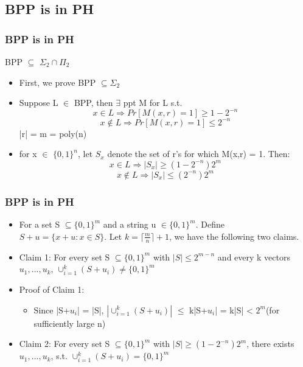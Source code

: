 \documentclass{beamer}
\begin{document}
\subsection{BPP is in PH}
\begin{frame}
\frametitle{BPP is in PH}
\begin{theorem}
BPP $\subseteq$ $\Sigma_{2} \cap \Pi_{2}$
\end{theorem}
\begin{itemize}
	\item First, we prove BPP $\subseteq \Sigma_{2}$ 
	\item Suppose L $\in$ BPP, then $\exists$ ppt M for L s.t.
	$$
	x \in L \Rightarrow Pr[M(x, r) = 1] \geq 1-2^{-n}
	$$
	$$
	x \notin L \Rightarrow Pr[M(x, r) = 1] \leq 2^{-n}
	$$
	|r| = m = poly(n)
	\item for x $\in$ $\{0,1\}^{n}$, let $S_{x}$ denote the set of r's for which M(x,r) = 1. Then:
	$$
	x \in L \Rightarrow |S_{x}| \geq (1-2^{-n})2^{m}
	$$
	$$
	x \notin L \Rightarrow |S_{x}| \leq (2^{-n})2^{m}
	$$
\end{itemize}
\end{frame}
\begin{frame}
\frametitle{BPP is in PH}
\begin{itemize}
	\item For a set S $\subseteq \{0, 1\}^{m}$ and a string u $\in \{0, 1\}^{m}$. Define $S+u = \{x+u:x \in S\}$. Let $k = \lceil \frac{m}{n} \rceil +1$, we have the following two claims.
	\item {\color{red} Claim 1}: For every set  S $\subseteq \{0, 1\}^{m}$ with $|S| \leq 2^{m-n}$ and every k vectors $u_{1},...,u_{k}$, $\cup_{i=1}^{k}(S+u_{i}) \neq \{0, 1\}^{m}$
	\item {\color{red} Proof of Claim 1}: 
	\begin{itemize}
		\item Since |S+$u_{i}$| = |S|, $|\cup_{i=1}^{k}(S+u_{i})|$ $\leq$ k|S+$u_{i}$| = k|S| < $2^{m}$(for sufficiently large n)
	\end{itemize}
	\item {\color{red} Claim 2}: For every set S $\subseteq \{0, 1\}^{m}$ with $|S| \geq (1-2^{-n})2^{m}$, there exists $u_{1},...,u_{k}$, s.t. $\cup_{i=1}^{k}(S+u_{i}) = \{0, 1\}^{m}$
\end{itemize}

\end{frame}
\end{document}

